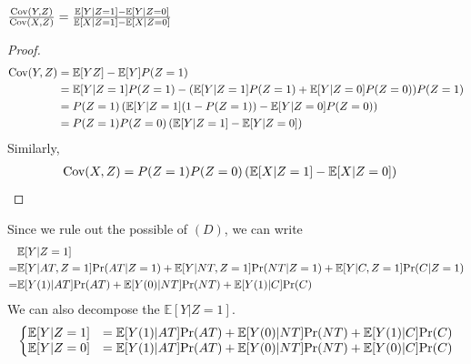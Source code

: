 \documentclass[11pt]{elegantbook}
\begin{document}
\begin{theorem}
    $\frac{\textnormal{Cov}(Y,Z)}{\textnormal{Cov}(X,Z)}=\frac{\mathbb{E}[Y|Z=1]-\mathbb{E}[Y|Z=0]}{\mathbb{E}[X|Z=1]-\mathbb{E}[X|Z=0]}$
\end{theorem}
\begin{proof}
    \begin{equation}
        \begin{aligned}
            \textnormal{Cov}(Y,Z)&=\mathbb{E}[YZ]-\mathbb{E}[Y]P(Z=1)\\
            &=\mathbb{E}[Y|Z=1]P(Z=1)-(\mathbb{E}[Y|Z=1]P(Z=1)+\mathbb{E}[Y|Z=0]P(Z=0))P(Z=1)\\
            &=P(Z=1)\left(\mathbb{E}[Y|Z=1](1-P(Z=1))-\mathbb{E}[Y|Z=0]P(Z=0)\right)\\
            &=P(Z=1)P(Z=0)\left(\mathbb{E}[Y|Z=1]-\mathbb{E}[Y|Z=0]\right)
        \end{aligned}
        \nonumber
    \end{equation}
    Similarly,
    \begin{equation}
        \begin{aligned}
            \textnormal{Cov}(X,Z)&=P(Z=1)P(Z=0)\left(\mathbb{E}[X|Z=1]-\mathbb{E}[X|Z=0]\right)
        \end{aligned}
        \nonumber
    \end{equation}
\end{proof}
Since we rule out the possible of $(D)$, we can write
\begin{equation}
    \begin{aligned}
        &\mathbb{E}[Y|Z=1]\\
        =&\mathbb{E}[Y|AT,Z=1]\textnormal{Pr}(AT|Z=1)+\mathbb{E}[Y|NT,Z=1]\textnormal{Pr}(NT|Z=1)+\mathbb{E}[Y|C,Z=1]\textnormal{Pr}(C|Z=1)\\
        =&\mathbb{E}[Y(1)|AT]\textnormal{Pr}(AT)+\mathbb{E}[Y(0)|NT]\textnormal{Pr}(NT)+\mathbb{E}[Y(1)|C]\textnormal{Pr}(C)
    \end{aligned}
    \nonumber
\end{equation}
We can also decompose the $\mathbb{E}[Y|Z=1]$.
\begin{equation}
    \begin{aligned}
        \left\{\begin{matrix}
            \mathbb{E}[Y|Z=1]&=\mathbb{E}[Y(1)|AT]\textnormal{Pr}(AT)+\mathbb{E}[Y(0)|NT]\textnormal{Pr}(NT)+\mathbb{E}[Y(1)|C]\textnormal{Pr}(C)\\
            \mathbb{E}[Y|Z=0]&=\mathbb{E}[Y(1)|AT]\textnormal{Pr}(AT)+\mathbb{E}[Y(0)|NT]\textnormal{Pr}(NT)+\mathbb{E}[Y(0)|C]\textnormal{Pr}(C)
        \end{matrix}\right.
    \end{aligned}
    \nonumber
\end{equation}
\end{document}
